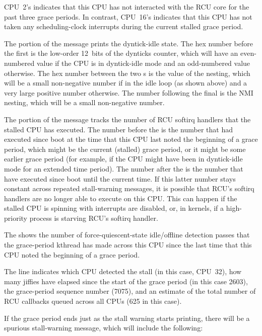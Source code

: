 CPU~2's  indicates that this CPU has not interacted with
the RCU core for the past three grace periods.
In contrast, CPU~16's 
indicates that this CPU has not taken any scheduling-clock
interrupts during the current stalled grace period.

The  portion of the message prints the dyntick-idle state.
The hex number before the first \qco{/} is the low-order 12~bits of the
dynticks counter, which will have an even-numbered value if the CPU
is in dyntick-idle mode and an odd-numbered value otherwise.
The hex
number between the two \qco{/}s is the value of the nesting, which will be
a small non-negative number if in the idle loop (as shown above) and a
very large positive number otherwise.
The number following the final
\qco{/} is the NMI nesting, which will be a small non-negative number.

The  portion of the message tracks the number of RCU softirq
handlers that the stalled CPU has executed.
The number before the \qco{/}
is the number that had executed since boot at the time that this CPU
last noted the beginning of a grace period, which might be the current
(stalled) grace period, or it might be some earlier grace period (for
example, if the CPU might have been in dyntick-idle mode for an extended
time period).
The number after the \qco{/} is the number that have executed
since boot until the current time.
If this latter number stays constant
across repeated stall-warning messages, it is possible that RCU's softirq
handlers are no longer able to execute on this CPU\@.
This can happen if
the stalled CPU is spinning with interrupts are disabled, or, in 
kernels, if a high-priority process is starving RCU's softirq handler.

The  shows the number of force-quiescent-state idle/offline
detection passes that the grace-period kthread has made across this
CPU since the last time that this CPU noted the beginning of a grace
period.

The  line indicates which CPU detected the stall (in this
case, CPU~32), how many jiffies have elapsed since the start of the grace
period (in this case 2603), the grace-period sequence number (7075), and
an estimate of the total number of RCU callbacks queued across all CPUs
(625 in this case).

If the grace period ends just as the stall warning starts printing,
there will be a spurious stall-warning message, which will include
the following:


